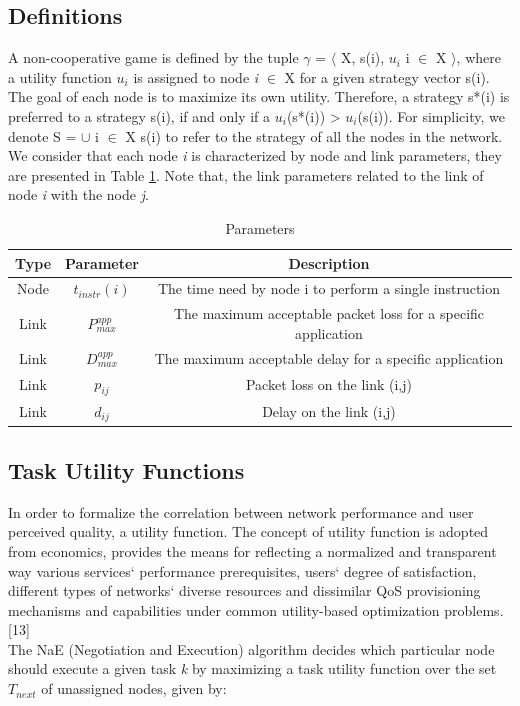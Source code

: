 \documentclass[a4paper]{article}
\begin{document}
\subsection{Definitions}
A non-cooperative game is defined by the tuple $\gamma$ = $\langle$ X, {s(i), $u_i$} i $\in$ X $\rangle$, where a utility function $u_i$ is assigned to node \textit{i} $\in$ X for a given strategy vector s(i). The goal of each node is to maximize its own utility. Therefore, a strategy s*(i) is preferred to a strategy s(i), if and only if a $u_i$(s*(i)) > $u_i$(s(i)). For simplicity, we denote S = $\cup$ i $\in$ X s(i) to refer to the strategy of all the nodes in the network. We consider that each node \textit{i} is characterized by node and link parameters, they are presented in Table \ref{table:parameters}. Note that, the link parameters related to the link of node \textit{i} with the node \textit{j}.\\

\begin{table}[tpb]
\centering
\caption{Parameters}
\label{table:parameters}
\begin{tabular}{|c|c|c|}
 \hline
 Type  & Parameter & Description \\
   \hline
	Node &  $t_{instr}(i)$ & The time need by node i to perform a single instruction \\
  \hline
	Link &  $P^{app}_{max}$ & The maximum acceptable packet loss for a specific application \\
  \hline
   Link &    $D^{app}_{max}$ & The maximum acceptable delay for a specific application \\
  \hline
  	Link &   $p_{ij}$ & Packet loss on the link (i,j) \\
  \hline
  	Link &   $d_{ij}$ & Delay on the link (i,j) \\
  \hline
\end{tabular}
\end{table}


\subsection{Task Utility Functions}
In order to formalize the correlation between network performance and user perceived quality, a utility function. The concept of utility function is adopted from economics, provides the means for reflecting a normalized and transparent way various services` performance prerequisites, users` degree of satisfaction, different types of networks` diverse resources and dissimilar QoS provisioning mechanisms and capabilities under common utility-based optimization problems. [13] \\ %
The NaE (Negotiation and Execution) algorithm decides which particular node should execute a given task \textit{k} by maximizing a task utility function over the set $T_{next}$ of unassigned nodes, given by:
\end{document}
